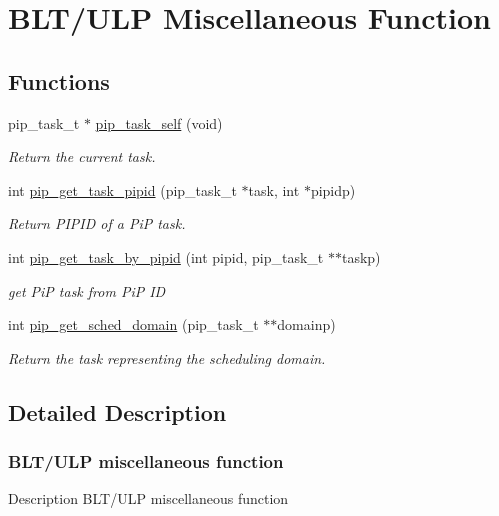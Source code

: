 \hypertarget{group__ULP-3-misc}{\section{B\-L\-T/\-U\-L\-P Miscellaneous Function}
\label{group__ULP-3-misc}
}
\subsection*{Functions}
\begin{DoxyCompactItemize}
\item 
pip\-\_\-task\-\_\-t $\ast$ \hyperlink{group__ULP-3-misc_gaf09a1abfd580696c74d4aa7be8255ad0}{pip\-\_\-task\-\_\-self} (void)
\begin{DoxyCompactList}\small\item\em Return the current task. \end{DoxyCompactList}\item 
int \hyperlink{group__ULP-3-misc_ga14a1b03ec6564885a5dd97dbc27167aa}{pip\-\_\-get\-\_\-task\-\_\-pipid} (pip\-\_\-task\-\_\-t $\ast$task, int $\ast$pipidp)
\begin{DoxyCompactList}\small\item\em Return P\-I\-P\-I\-D of a Pi\-P task. \end{DoxyCompactList}\item 
int \hyperlink{group__ULP-3-misc_ga147decca4226959d822b73b7c31a4465}{pip\-\_\-get\-\_\-task\-\_\-by\-\_\-pipid} (int pipid, pip\-\_\-task\-\_\-t $\ast$$\ast$taskp)
\begin{DoxyCompactList}\small\item\em get Pi\-P task from Pi\-P I\-D \end{DoxyCompactList}\item 
int \hyperlink{group__ULP-3-misc_ga32119e3a41a4073b52ade76bf87a5589}{pip\-\_\-get\-\_\-sched\-\_\-domain} (pip\-\_\-task\-\_\-t $\ast$$\ast$domainp)
\begin{DoxyCompactList}\small\item\em Return the task representing the scheduling domain. \end{DoxyCompactList}\end{DoxyCompactItemize}


\subsection{Detailed Description}
\hypertarget{ulp-misc}{}\subsubsection{B\-L\-T/\-U\-L\-P miscellaneous function}\label{ulp-misc}
\begin{DoxyParagraph}{Description}
B\-L\-T/\-U\-L\-P miscellaneous function 
\end{DoxyParagraph}


